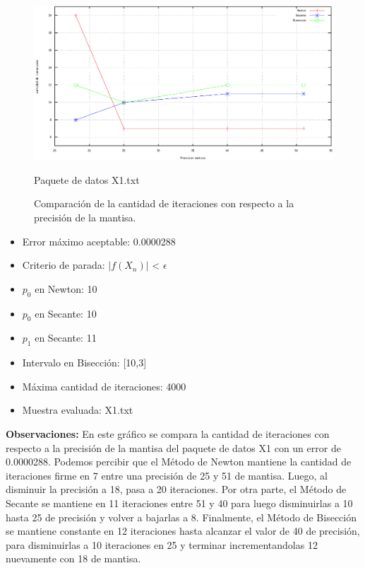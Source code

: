 \documentclass[10pt, a4paper]{article}
\begin{document}
\begin{figure}[H] %
\begin{center}
\includegraphics[width=370pt]{./cantidaditeraciones_mantisax1.png}
\caption[h]{Comparaci\'on de la cantidad de iteraciones con respecto a la precisi\'on de la mantisa.}{Paquete de datos X1.txt}
\end{center}
\end{figure}

\begin{itemize}
\item Error m\'aximo aceptable: 0.0000288
\item Criterio de parada: $|f(X_{n})|$ < $\epsilon$ 
\item $p_{0}$ en Newton: 10
\item $p_{0}$ en Secante: 10
\item $p_{1}$ en Secante: 11
\item Intervalo en Bisecci\'on: [10,3]
\item M\'axima cantidad de iteraciones: 4000
\item Muestra evaluada: X1.txt
\end{itemize}

\large{\textbf{Observaciones:}}
En este gr\'afico se compara la cantidad de iteraciones con respecto a la precisi\'on de la mantisa del paquete de datos X1 con un error de 0.0000288.\newline
Podemos percibir que el M\'etodo de Newton mantiene la cantidad de iteraciones firme en 7 entre una precisi\'on de 25 y 51 de mantisa. Luego, al disminuir la precisi\'on a 18, pasa a 20 iteraciones. Por otra parte, el M\'etodo de Secante se mantiene en 11 iteraciones entre 51 y 40 para luego disminuirlas a 10 hasta 25 de precisi\'on y volver a bajarlas a 8. Finalmente, el M\'etodo de Bisecci\'on se mantiene constante en 12 iteraciones hasta alcanzar el valor de 40 de precisi\'on, para disminuirlas a 10 iteraciones en 25 y terminar incrementandolas 12 nuevamente con 18 de mantisa.\newline
\end{document}
